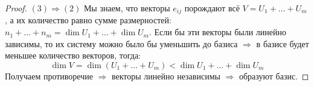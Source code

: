 \documentclass[12pt]{article}
\theoremstyle{definition}
\begin{document}
\begin{proof}
	$(3) \Rightarrow (2)$ Мы знаем, что векторы $e_{ij}$ порождают всё $V = U_1 + \dotsc + U_m$, а их количество равно сумме размерностей: $n_1 + \dotsc + n_m = \dim{U_1} + \dotsc + \dim{U_m}$. Если бы эти векторы были линейно зависимы, то их систему можно было бы уменьшить до базиса $\Rightarrow$ в базисе будет меньшее количество векторов, тогда:
	$$
		\dim{V} = \dim{(U_1 + \dotsc +U_m)} < \dim{U_1} + \dotsc + \dim{U_m}
	$$ 
	Получаем противоречие $\Rightarrow$ векторы линейно независимы $\Rightarrow$ образуют базис.
\end{proof}
\end{document}
